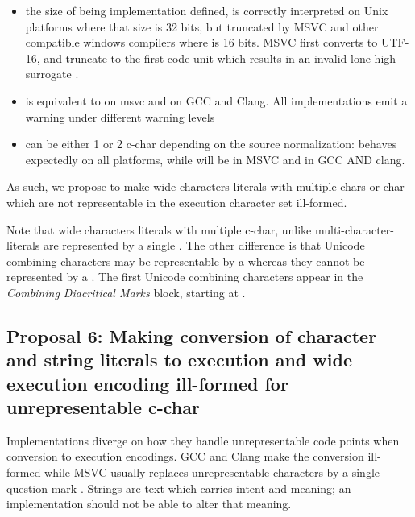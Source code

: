 \documentclass{wg21}
\newcommand{\UnicodeLetter}[1]{\textbf{\textcolor{BrickRed}{\Large\tcode{#1}}}}
\begin{document}
\begin{itemize}
\item the size of  being implementation defined,  is correctly interpreted on Unix platforms where that size is 32 bits, but truncated by MSVC and other compatible windows compilers where  is 16 bits.
MSVC first converts to UTF-16, and truncate to the first code unit which results in an invalid lone high surrogate .


\item  {} is equivalent to  on msvc and   on GCC and Clang. All implementations emit a warning under different warning levels 

\item {} can be either 1 or 2 c-char depending on the source normalization:  behaves expectedly on all platforms, 
while   will be  in MSVC and  in GCC AND clang.

\end{itemize}

As such, we propose to make wide characters literals with multiple-chars or char which are not representable in the execution character set ill-formed.

Note that wide characters literals with multiple c-char, unlike multi-character-literals are represented by a single .
The other difference is that Unicode combining characters may be representable by a  whereas they cannot be represented by a . 
The first Unicode combining characters appear in the \emph{Combining Diacritical Marks} block, starting at .


\subsection{Proposal 6: Making conversion of character and string literals to execution and wide execution encoding ill-formed for unrepresentable c-char}

Implementations diverge on how they handle unrepresentable code points when conversion to execution encodings.
GCC and Clang make the conversion ill-formed while MSVC usually replaces unrepresentable characters by a single question mark \UnicodeLetter{?}.
Strings are text which carries intent and meaning; an implementation should not be able to alter that meaning.
\end{document}
